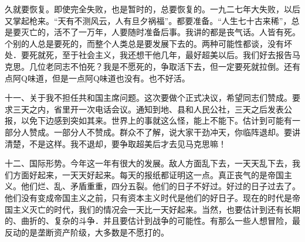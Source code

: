 久就要恢复。即使完全失败，也是暂时的，总要恢复的。一九二七年大失败，以后又掌起枪来。“天有不测风云，人有旦夕祸福”。都要准备。“人生七十古来稀”，总是要灭亡的，活不了一万年，人要随时准备后事。我讲的都是丧气话。人皆有死。个别的人总是要死的，而整个人类总是要发展下去的。两种可能性都谈，没有坏处．要死就死，至于社会主义，我还想干他几年，最好超美以后。我们好去报告马克思。几位老同志不怕死？我是不愿死的，争取活下去，但一定要死就拉倒。还有点阿Q味道，但是一点阿Q味道也没有。也不好活。

十一、关于我不担任共和国主席问题。这次要做个正式决议，希望同志们赞成。要求三天之内，省里开一次电话会议。通知到地、县和人民公社，三天之后发表公报，以免下边感到突如其来。世界上的事就这么怪，能上不能下。估计到可能有一部分人赞成。一部分人不赞成。群众不了解，说大家干劲冲天，你临阵退却。要讲清楚，不是这样。我不退却，要争取超美后才去见马克思嘛！

十二、国际形势。今年这一年有很大的发展。敌人方面乱下去，一天天乱下去，我们方面好起来，一天天好起来。每天的报纸都证明这一点。真正丧气的是帝国主义。他们烂、乱、矛盾重重，四分五裂。他们的日子不好过。好过的日子过去了。他们没有变成帝国主义之前，只有资本主义时代是他们的好日子。现在的时代是帝国主义灭亡的时代，我们的情况会一天比一天好起来。当然，也要估计到还有长期的、曲折的、复杂的斗争．并且要估计到战争的可能性。有那么一些人想冒险，最反动的是垄断资产阶级，大多数是不愿打的。


